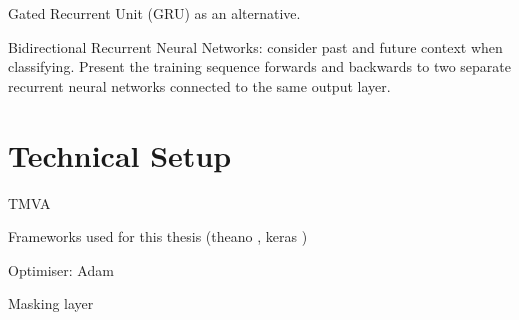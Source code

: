 Gated Recurrent Unit (GRU) as an alternative.

Bidirectional Recurrent Neural Networks: consider past and future context when
classifying. Present the training sequence forwards and backwards to two
separate recurrent neural networks connected to the same output layer.

\section{Technical Setup}
\label{sec:tech_setup}

TMVA

Frameworks used for this thesis (theano \cite{theano}, keras \cite{keras})

Optimiser: Adam

Masking layer


